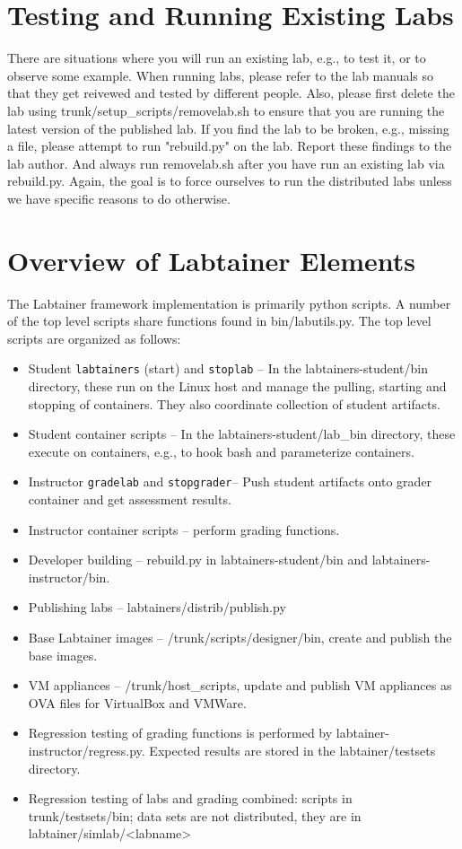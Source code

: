 \documentclass[12pt]{article}
\begin{document}
\section{Testing and Running Existing Labs}
There are situations where you will run an existing lab, e.g., to test it, or to 
observe some example.  When running labs, please refer to the lab manuals
so that they get reivewed and tested by different people.  Also, please first delete
the lab using trunk/setup\_scripts/removelab.sh to ensure that you are running the latest
version of the published lab.  If you find the lab to be broken, e.g., missing a file, please
attempt to run "rebuild.py" on the lab.  Report these findings to the lab author.  And always
run removelab.sh after you have run an existing lab via rebuild.py.  Again, the goal is to
force ourselves to run the distributed labs unless we have specific reasons to do otherwise.

\section{Overview of Labtainer Elements}
The Labtainer framework implementation is primarily python scripts.  A number of the 
top level scripts share functions found in bin/labutils.py.  The 
top level scripts are organized as follows:

\begin{itemize}
\item Student {\tt labtainers} (start) and {\tt stoplab} -- In the labtainers-student/bin directory, these run on the 
Linux host and manage the pulling, starting and stopping of containers.  They also coordinate
collection of student artifacts.
\item Student container scripts -- In the labtainers-student/lab\_bin directory, these execute on
containers, e.g., to hook bash and parameterize containers.
\item Instructor {\tt gradelab} and {\tt stopgrader}-- Push student artifacts onto grader container and get assessment results.
\item Instructor container scripts -- perform grading functions.
\item Developer building -- rebuild.py in labtainers-student/bin and labtainers-instructor/bin.
\item Publishing labs -- labtainers/distrib/publish.py
\item Base Labtainer images -- /trunk/scripts/designer/bin, create and publish the base images.
\item VM appliances -- /trunk/host\_scripts, update and publish VM appliances as OVA files for 
VirtualBox and VMWare.
\item Regression testing of grading functions is performed by labtainer-instructor/regress.py.
Expected results are stored in the labtainer/testsets directory.
\item Regression testing of labs and grading combined: scripts in trunk/testsets/bin; data sets
are not distributed, they are in labtainer/simlab/<labname>
\end{itemize}
\end{document}
